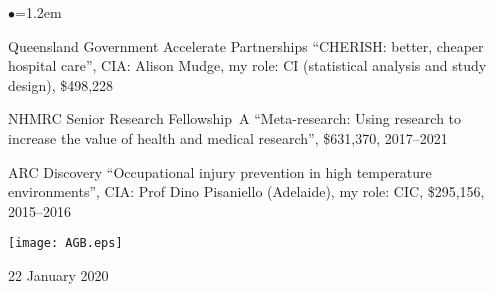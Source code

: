 \documentclass[a4paper,11pt]{article}
\renewcommand{\labelitemi}{$\bullet$}
\begin{document}
\begin{raggedright}
\begin{list}{\labelitemi}{\leftmargin=1.2em}
\item Queensland Government Accelerate Partnerships ``CHERISH: better, cheaper hospital care'', CIA: Alison Mudge, my role: CI (statistical analysis and study design), \$498,228 %

\item NHMRC Senior Research Fellowship~A ``Meta-research: Using research to increase the value of health and medical research'', \$631,370, 2017--2021


\item ARC Discovery ``Occupational injury prevention in high temperature environments'', CIA: Prof Dino Pisaniello (Adelaide), my role: CIC, \$295,156, 2015--2016

\end{list}


\texttt{[image: AGB.eps]}

22 January 2020

\end{raggedright}
\end{document}

